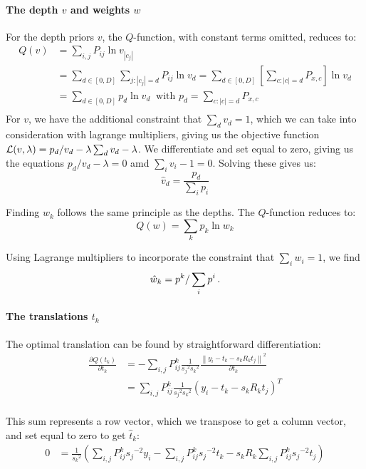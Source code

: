 \documentclass[10pt,a4paper,oneside]{article}
\theoremstyle{definition}
\newcommand{\p}{\mbox{\,.}}
\theoremstyle{definition}
\begin{document}
\paragraph{The depth $v$ and weights $w$} For the depth priors $v$, the $Q$-function, with constant terms omitted, reduces to:
\begin{align*}
Q(v) &= \sum_{i,j} P_{ij} \ln v_{|c_j|} \\ 
&= \sum_{d \in [0,D]} \sum_{j: |c_j| = d} P_{ij} \ln v_d = \sum_{d \in [0,D]} \left[\sum_{c: |c| = d} P_{x, c}\right] \ln v_d\\
&= \sum_{d \in [0,D]} p_d \ln v_d \;\;\text{with $p_d = \sum_{c: |c| = d} P_{x, c} $}  \\
\end{align*}
For $v$, we have the additional constraint that $\sum_d v_d = 1$, which we can take into consideration with lagrange multipliers, giving us the objective function ${\cal L}(v, \lambda) = p_d/v_d - \lambda\sum_d v_d - \lambda$. We differentiate and set equal to zero, giving us the equations $p_d/v_d - \lambda = 0$ amd $\sum_i v_i -1 =0$. Solving these gives us:
\[
\hat v_d = \frac{p_d}{\sum_i p_i}
\]

Finding $w_k$ follows the same principle as the depths. The $Q$-function reduces to:
\[
Q(w) = \sum_{k} p_k \ln w_k
\]

Using Lagrange multipliers to incorporate the constraint that $\sum_i w_i = 1$, we find
\[
\hat w_k = p^k / \sum_{i} p^i \p
\]

\paragraph{The translations $t_k$} The optimal translation can be found by straightforward differentiation:
\begin{align*}
\frac{\partial Q(t_k)}{\partial t_k} &= 
- \sum_{i,j} P_{ij}^k \frac{1}{{s_j}^2{s_k}^2}\frac{\left \|  y_i - t_k - s_kR_kt_j \right\|^2}{\partial t_k}
\\
&= \sum_{i,j} P_{ij}^k \frac{1}{{s_j}^2{s_k}^2} \left(y_i - t_k - s_kR_kt_j\right)^T \\
\end{align*}

This sum represents a row vector, which we transpose to get a column vector, and set equal to zero to get $\hat t_k$:
\begin{align*}
0 &= \frac{1} {{s_k}^2} \left (\sum_{i,j} P^k_{ij} {s_j}^{-2} y_i  - \sum_{i,j} P^k_{ij} {s_j}^{-2} t_k - s_kR_k \sum_{i,j} P^k_{ij} {s_j}^{-2} t_j\right) \\
\end{align*}
\end{document}
